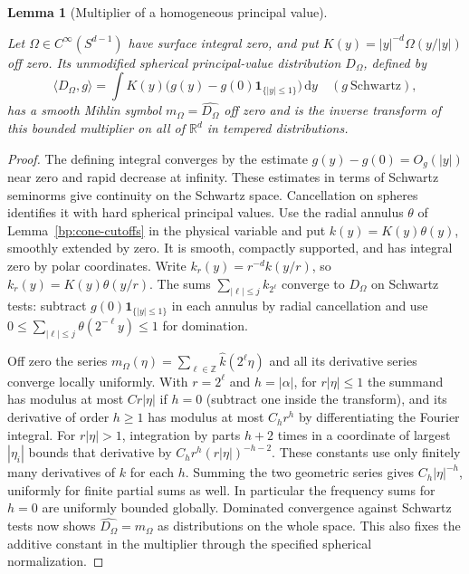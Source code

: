\documentclass[11pt,letterpaper]{article}
\newtheorem{lemma}[theorem]{Lemma}
\theoremstyle{definition}
\newcommand{\R}{\mathbb R}
\newcommand{\ind}{\mathbf1}
\newcommand{\dd}{\,\mathrm d}
\providecommand{\lean}[1]{}
\providecommand{\uses}[1]{}
\begin{document}
\begin{lemma}[Multiplier of a homogeneous principal value]
\label{bp:homogeneous-symbol}
\lean{TwistedParaproduct.homogeneousSymbol}
Let \(\Omega\in C^\infty(S^{d-1})\) have surface integral zero, and
put \(K(y)=|y|^{-d}\Omega(y/|y|)\) off zero. Its unmodified spherical
principal-value distribution \(D_\Omega\), defined by
\[
 \langle D_\Omega,g\rangle=
 \int K(y)\big(g(y)-g(0)\ind_{\{|y|\le1\}}\big)\dd y
 \quad(g\ \text{Schwartz}),
\]
has a smooth Mihlin symbol \(m_\Omega=\widehat{D_\Omega}\) off zero
and is the inverse transform of this bounded multiplier on all of
\(\R^d\) in tempered distributions.
\end{lemma}
\begin{proof}
\uses{bp:cone-cutoffs}
The defining integral converges by the estimate \(g(y)-g(0)=O_g(|y|)\)
near zero and rapid decrease at infinity. These estimates in terms
of Schwartz seminorms give continuity on the Schwartz space.
Cancellation on spheres identifies it with hard spherical principal
values. Use the radial annulus \(\theta\) of Lemma~\ref{bp:cone-cutoffs}
in the physical variable and put \(k(y)=K(y)\theta(y)\), smoothly
extended by zero. It is smooth, compactly supported, and has integral
zero by polar coordinates. Write \(k_r(y)=r^{-d}k(y/r)\), so
\(k_r(y)=K(y)\theta(y/r)\). The sums \(\sum_{|\ell|\le j}k_{2^\ell}\)
converge to \(D_\Omega\) on Schwartz tests: subtract
\(g(0)\ind_{\{|y|\le1\}}\) in each annulus by radial cancellation
and use \(0\le\sum_{|\ell|\le j}\theta(2^{-\ell}y)\le1\) for domination.

Off zero the series \(m_\Omega(\eta)=\sum_{\ell\in\mathbb Z}
\widehat k(2^\ell\eta)\) and all its derivative series converge
locally uniformly. With \(r=2^\ell\) and \(h=|\alpha|\), for
\(r|\eta|\le1\) the summand has modulus at most \(C r|\eta|\) if
\(h=0\) (subtract one inside the transform), and its derivative of
order \(h\ge1\) has modulus at most \(C_h r^h\) by differentiating
the Fourier integral. For \(r|\eta|>1\), integration by parts \(h+2\)
times in a coordinate of largest \(|\eta_i|\) bounds that derivative
by \(C_h r^h(r|\eta|)^{-h-2}\). These constants use only finitely
many derivatives of \(k\) for each \(h\). Summing the two geometric
series gives \(C_h|\eta|^{-h}\), uniformly for finite partial sums
as well. In particular the frequency sums for \(h=0\) are uniformly
bounded globally. Dominated convergence against Schwartz tests now
shows \(\widehat{D_\Omega}=m_\Omega\) as distributions on the whole
space. This also fixes the additive constant in the multiplier
through the specified spherical normalization.
\end{proof}
\end{document}
